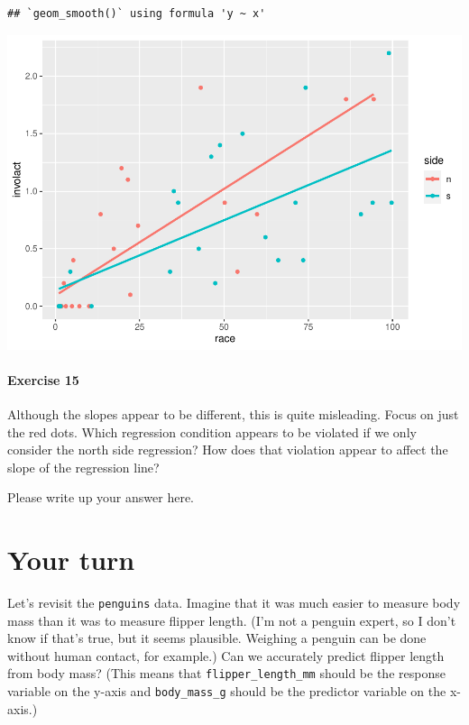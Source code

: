 \documentclass[
]{book}
\begin{document}
\begin{verbatim}
## `geom_smooth()` using formula 'y ~ x'
\end{verbatim}

\includegraphics{intro_stats_files/figure-latex/unnamed-chunk-197-1.pdf}

\hypertarget{exercise-15-1}{%
\paragraph*{Exercise 15}\label{exercise-15-1}}

Although the slopes appear to be different, this is quite misleading. Focus on just the red dots. Which regression condition appears to be violated if we only consider the north side regression? How does that violation appear to affect the slope of the regression line?

Please write up your answer here.

\hypertarget{regression-your-turn}{%
\section{Your turn}\label{regression-your-turn}}

Let's revisit the \texttt{penguins} data. Imagine that it was much easier to measure body mass than it was to measure flipper length. (I'm not a penguin expert, so I don't know if that's true, but it seems plausible. Weighing a penguin can be done without human contact, for example.) Can we accurately predict flipper length from body mass? (This means that \texttt{flipper\_length\_mm} should be the response variable on the y-axis and \texttt{body\_mass\_g} should be the predictor variable on the x-axis.)
\end{document}
